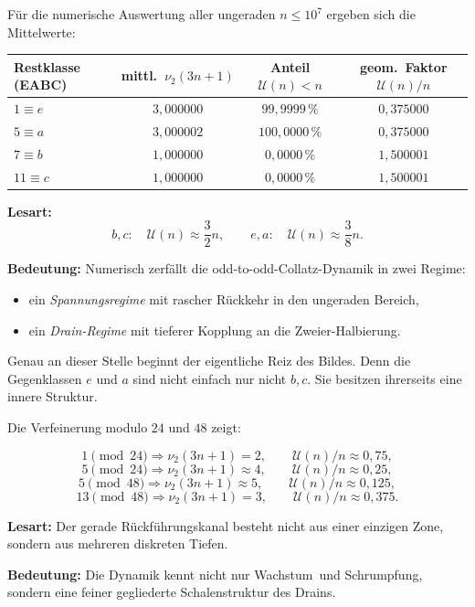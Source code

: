 \documentclass[12pt,a4paper]{article}
\newcommand{\vii}{\nu_2}
\newcommand{\U}{\mathcal U}
\begin{document}
\begin{tcolorbox}[
colback=red!3,
colframe=red!45!black,
title=\textbf{3. Numerische Evidenz: Die Gegenklassen wirken als Drain}
]
Für die numerische Auswertung aller ungeraden \(n \le 10^7\) ergeben sich die Mittelwerte:

\begin{center}
\begin{tabular}{lccc}
\toprule
Restklasse (EABC) & mittl.\ \(\vii(3n+1)\) & Anteil \(\U(n)<n\) & geom.\ Faktor \(\U(n)/n\)\\
\midrule
\(1\equiv e\) & \(3{,}000000\) & \(99{,}9999\,\%\) & \(0{,}375000\)\\
\(5\equiv a\) & \(3{,}000002\) & \(100{,}0000\,\%\) & \(0{,}375000\)\\
\(7\equiv b\) & \(1{,}000000\) & \(0{,}0000\,\%\) & \(1{,}500001\)\\
\(11\equiv c\) & \(1{,}000000\) & \(0{,}0000\,\%\) & \(1{,}500001\)\\
\bottomrule
\end{tabular}
\end{center}

\textbf{Lesart:}
\[
b,c:\quad \U(n)\approx \frac32 n,
\qquad
e,a:\quad \U(n)\approx \frac38 n.
\]

\medskip
\textbf{Bedeutung:}
Numerisch zerfällt die odd-to-odd-Collatz-Dynamik in zwei Regime:
\begin{itemize}[leftmargin=1.5em]
\item ein \emph{Spannungsregime} mit rascher Rückkehr in den ungeraden Bereich,
\item ein \emph{Drain-Regime} mit tieferer Kopplung an die Zweier-Halbierung.
\end{itemize}
\end{tcolorbox}

\noindent
Genau an dieser Stelle beginnt der eigentliche Reiz des Bildes. Denn die Gegenklassen \(e\) und \(a\) sind nicht einfach nur \glqq nicht \(b,c\)\grqq. Sie besitzen ihrerseits eine innere Struktur.

\begin{tcolorbox}[
colback=orange!4,
colframe=orange!60!black,
title=\textbf{4. Der Drain ist nicht einheitlich, sondern geschichtet}
]
Die Verfeinerung modulo \(24\) und \(48\) zeigt:

\[
1 \pmod{24}\Rightarrow \vii(3n+1)=2,\qquad \U(n)/n\approx 0{,}75,
\]
\[
5 \pmod{24}\Rightarrow \vii(3n+1)\approx 4,\qquad \U(n)/n\approx 0{,}25,
\]
\[
5 \pmod{48}\Rightarrow \vii(3n+1)\approx 5,\qquad \U(n)/n\approx 0{,}125,
\]
\[
13 \pmod{48}\Rightarrow \vii(3n+1)=3,\qquad \U(n)/n\approx 0{,}375.
\]

\medskip
\textbf{Lesart:}
Der gerade Rückführungskanal besteht nicht aus einer einzigen Zone, sondern aus mehreren diskreten Tiefen.

\medskip
\textbf{Bedeutung:}
Die Dynamik kennt nicht nur \glqq Wachstum\grqq\ und \glqq Schrumpfung\grqq, sondern eine feiner gegliederte Schalenstruktur des Drains.
\end{tcolorbox}
\end{document}
